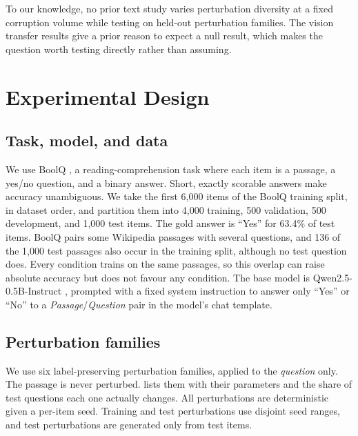 \documentclass[11pt]{article}
\begin{document}
To our knowledge, no prior text study varies perturbation diversity at a fixed corruption volume while testing on held-out perturbation families. The vision transfer results give a prior reason to expect a null result, which makes the question worth testing directly rather than assuming.

\section{Experimental Design}
\label{sec:design}

\subsection{Task, model, and data}

We use BoolQ \citep{clark2019boolq}, a reading-comprehension task where each item is a passage, a yes/no question, and a binary answer. Short, exactly scorable answers make accuracy unambiguous. We take the first 6{,}000 items of the BoolQ training split, in dataset order, and partition them into 4{,}000 training, 500 validation, 500 development, and 1{,}000 test items. The gold answer is ``Yes'' for 63.4\% of test items. BoolQ pairs some Wikipedia passages with several questions, and 136 of the 1{,}000 test passages also occur in the training split, although no test question does. Every condition trains on the same passages, so this overlap can raise absolute accuracy but does not favour any condition. The base model is Qwen2.5-0.5B-Instruct \citep{qwen2025qwen25}, prompted with a fixed system instruction to answer only ``Yes'' or ``No'' to a \emph{Passage}/\emph{Question} pair in the model's chat template.

\subsection{Perturbation families}

We use six label-preserving perturbation families, applied to the \emph{question} only. The passage is never perturbed.  lists them with their parameters and the share of test questions each one actually changes. All perturbations are deterministic given a per-item seed. Training and test perturbations use disjoint seed ranges, and test perturbations are generated only from test items.
\end{document}
